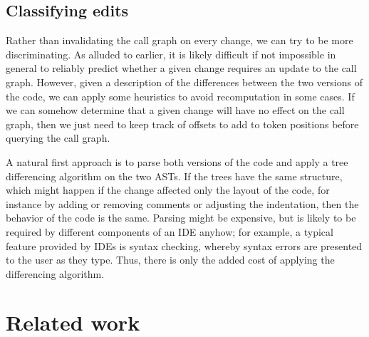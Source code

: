 
\subsection{Classifying edits}

Rather than invalidating the call graph on every change, we can try to be more
discriminating. As alluded to earlier, it is likely difficult if not impossible
in general to reliably predict whether a given change requires an update to the
call graph. However, given a description of the differences between the two
versions of the code, we can apply some heuristics to avoid recomputation in
some cases. If we can somehow determine that a given change will have no effect
on the call graph, then we just need to keep track of offsets to add to token
positions before querying the call graph.

A natural first approach is to parse both versions of the code and apply a tree
differencing algorithm on the two ASTs. If the trees have the same structure,
which might happen if the change affected only the layout of the code, for
instance by adding or removing comments or adjusting the indentation, then the
behavior of the code is the same. Parsing might be expensive, but is likely to
be required by different components of an IDE anyhow; for example, a typical
feature provided by IDEs is syntax checking, whereby syntax errors are
presented to the user as they type. Thus, there is only the added cost of
applying the differencing algorithm.



\section{Related work}



